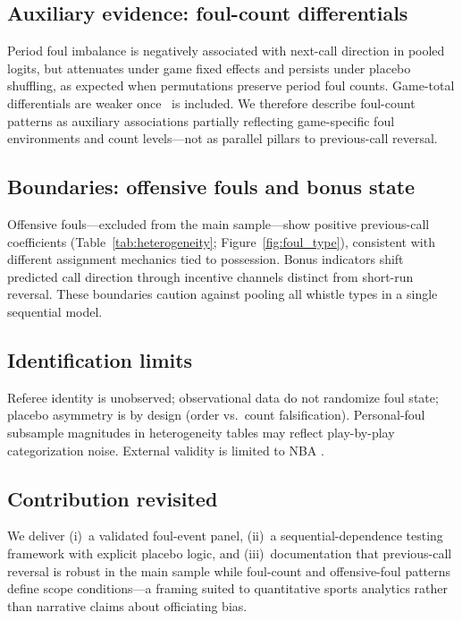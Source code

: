 \subsection{Auxiliary evidence: foul-count differentials}

Period foul imbalance is negatively associated with next-call direction in pooled logits, but attenuates under game fixed effects and persists under placebo shuffling, as expected when permutations preserve period foul counts. Game-total differentials are weaker once \foullast\ is included. We therefore describe foul-count patterns as auxiliary associations partially reflecting game-specific foul environments and count levels---not as parallel pillars to previous-call reversal.

\subsection{Boundaries: offensive fouls and bonus state}

Offensive fouls---excluded from the main sample---show positive previous-call coefficients (Table~\ref{tab:heterogeneity}; Figure~\ref{fig:foul_type}), consistent with different assignment mechanics tied to possession. Bonus indicators shift predicted call direction through incentive channels distinct from short-run reversal. These boundaries caution against pooling all whistle types in a single sequential model.

\subsection{Identification limits}

Referee identity is unobserved; observational data do not randomize foul state; placebo asymmetry is by design (order vs.\ count falsification). Personal-foul subsample magnitudes in heterogeneity tables may reflect play-by-play categorization noise. External validity is limited to NBA \sampleseasons{}.

\subsection{Contribution revisited}

We deliver (i)~a validated foul-event panel, (ii)~a sequential-dependence testing framework with explicit placebo logic, and (iii)~documentation that previous-call reversal is robust in the main sample while foul-count and offensive-foul patterns define scope conditions---a framing suited to quantitative sports analytics rather than narrative claims about officiating bias.
